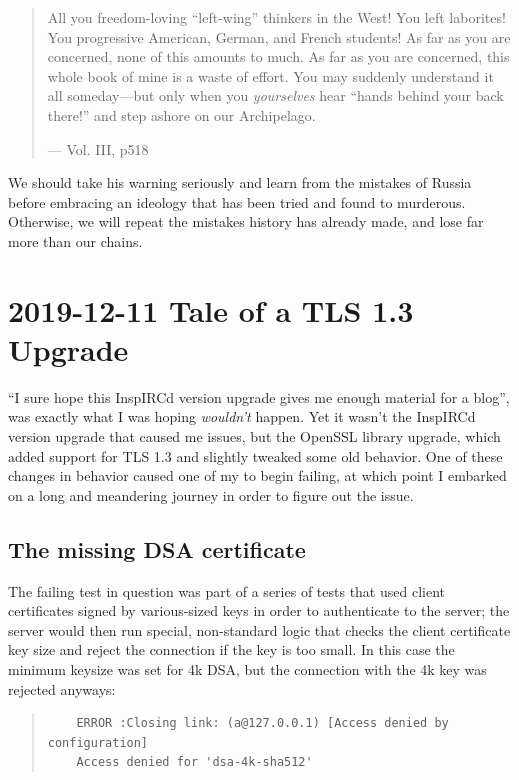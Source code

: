\documentclass{article}
\begin{document}
\begin{quote}
All you freedom-loving ``left-wing'' thinkers in the West!  You left laborites!  You progressive American, German, and French students!  As far as you are concerned, none of this amounts to much.  As far as you are concerned, this whole book of mine is a waste of effort.  You may suddenly understand it all someday---but only when you \emph{yourselves} hear ``hands behind your back there!'' and step ashore on our Archipelago.

--- Vol. III, p518
\end{quote}

We should take his warning seriously and learn from the mistakes of Russia before embracing an ideology that has been tried and found to murderous.  Otherwise, we will repeat the mistakes history has already made, and lose far more than our chains.


\section{2019-12-11 Tale of a TLS 1.3 Upgrade}
``I sure hope this InspIRCd version upgrade gives me enough material for a blog'', was exactly what I was hoping \emph{wouldn't} happen.  Yet it wasn't the InspIRCd version upgrade that caused me issues, but the OpenSSL library upgrade, which added support for TLS 1.3 and slightly tweaked some old behavior.  One of these changes in behavior caused one of my  to begin failing, at which point I embarked on a long and meandering journey in order to figure out the issue.

\subsection{The missing DSA certificate}

The failing test in question was part of a series of tests that used client certificates signed by various-sized  keys in order to authenticate to the server; the server would then run special, non-standard logic that checks the client certificate key size and reject the connection if the key is too small.  In this case the minimum keysize was set for 4k DSA, but the connection with the 4k key was rejected anyways:

\begin{quote}
\begin{verbatim}
	ERROR :Closing link: (a@127.0.0.1) [Access denied by configuration]
	Access denied for 'dsa-4k-sha512'
\end{verbatim}
\end{quote}
\end{document}
